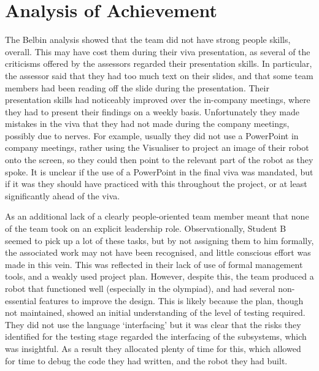 

\section{Analysis of Achievement}\label{sec:achievement}
    The Belbin analysis showed that the team did not have strong people skills, overall.
    This may have cost them during their viva presentation, as several of the criticisms offered by the assessors regarded their presentation skills.
    In particular, the assessor said that they had too much text on their slides, and that some team members had been reading off the slide during the presentation.
    Their presentation skills had noticeably improved over the in-company meetings, where they had to present their findings on a weekly basis.
    Unfortunately they made mistakes in the viva that they had not made during the company meetings, possibly due to nerves.
    For example, usually they did not use a PowerPoint in company meetings, rather using the Visualiser to project an image of their robot onto the screen, so they could then point to the relevant part of the robot as they spoke.
    It is unclear if the use of a PowerPoint in the final viva was mandated, but if it was they should have practiced with this throughout the project, or at least significantly ahead of the viva.

    As an additional lack of a clearly people-oriented team member meant that none of the team took on an explicit leadership role.
    Observationally, Student B seemed to pick up a lot of these tasks, but by not assigning them to him formally, the associated work may not have been recognised, and little conscious effort was made in this vein.
    This was reflected in their lack of use of formal management tools, and a weakly used project plan.
    However, despite this, the team produced a robot that functioned well (especially in the olympiad), and had several non-essential features to improve the design.
    This is likely because the plan, though not maintained, showed an initial understanding of the level of testing required.
    They did not use the language `interfacing' but it was clear that the risks they identified for the testing stage regarded the interfacing of the subsystems, which was insightful.
    As a result they allocated plenty of time for this, which allowed for time to debug the code they had written, and the robot they had built.

